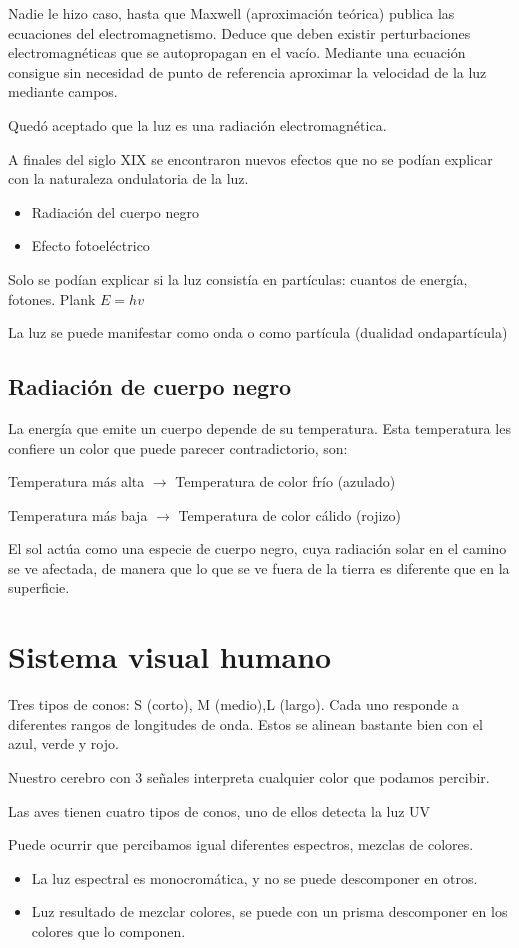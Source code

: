 Nadie le hizo caso, hasta que Maxwell (aproximación teórica) publica las ecuaciones del electromagnetismo. Deduce que deben existir perturbaciones electromagnéticas que se autopropagan en el vacío. Mediante una ecuación consigue sin necesidad de punto de referencia aproximar la velocidad de la luz mediante campos.

Quedó aceptado que la luz es una radiación electromagnética.

A finales del siglo XIX se encontraron nuevos efectos que no se podían explicar con la naturaleza ondulatoria de la luz.
\begin{itemize}
    \item Radiación del cuerpo negro
    \item Efecto fotoeléctrico
\end{itemize}

Solo se podían explicar si la luz consistía en partículas: cuantos de energía, fotones. Plank $E=hv$

La luz se puede manifestar como onda o como partícula (dualidad ondapartícula)

\subsection{Radiación de cuerpo negro}
La energía que emite un cuerpo depende de su temperatura. Esta temperatura les confiere un color que puede parecer contradictorio, son:

Temperatura más alta $\rightarrow$ Temperatura de color frío (azulado)

Temperatura más baja $\rightarrow$ Temperatura de color cálido (rojizo)

El sol actúa como una especie de cuerpo negro, cuya radiación solar en el camino se ve afectada, de manera que lo que se ve fuera de la tierra es diferente que en la superficie.

\section{Sistema visual humano}
Tres tipos de conos: S (corto), M (medio),L (largo). Cada uno responde a diferentes rangos de longitudes de onda. Estos se alinean bastante bien con el azul, verde y rojo.

Nuestro cerebro con 3 señales interpreta cualquier color que podamos percibir.

Las aves tienen cuatro tipos de conos, uno de ellos detecta la luz UV

Puede ocurrir que percibamos igual diferentes espectros, mezclas de colores.
\begin{itemize}
    \item La luz espectral es monocromática, y no se puede descomponer en otros.
    \item Luz resultado de mezclar colores, se puede con un prisma descomponer en los colores que lo componen.
\end{itemize}

